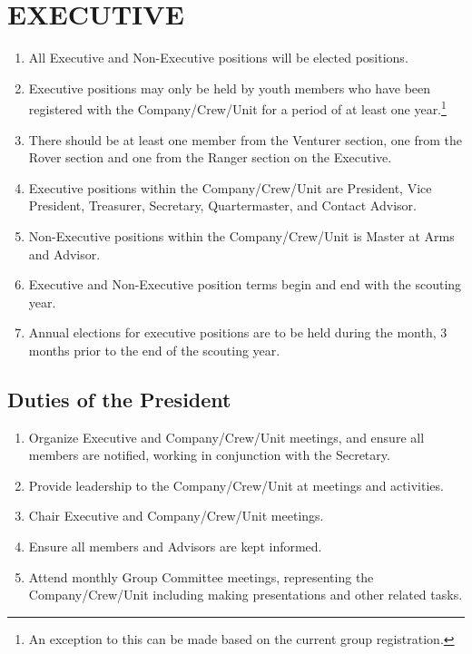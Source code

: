 \documentclass{Service_Corps_Document}
\begin{document}
    \section{EXECUTIVE}\label{sec:executive}
    \begin{enumerate}
        \item All Executive and Non-Executive positions will be elected positions.
        \item Executive positions may only be held by youth members who have been registered with the Company/Crew/Unit for a period of at least one year.\footnote{An exception to this can be made based on the current group registration.}
        \item There should be at least one member from the Venturer section, one from the Rover section and one from the Ranger section on the Executive.\footnotemark[\value{footnote}]
        \item Executive positions within the Company/Crew/Unit are President, Vice President, Treasurer, Secretary, Quartermaster, and Contact Advisor.
        \item Non-Executive positions within the Company/Crew/Unit is Master at Arms and Advisor.
        \item Executive and Non-Executive position terms begin and end with the scouting year.
        \item Annual elections for executive positions are to be held during the month, 3 months prior to the end of the scouting year.
    \end{enumerate}

    \subsection{Duties of the President}\label{subsec:duties-of-the-president}
    \begin{enumerate}
        \item Organize Executive and Company/Crew/Unit meetings, and ensure all members are notified, working in conjunction with the Secretary.
        \item Provide leadership to the Company/Crew/Unit at meetings and activities.
        \item Chair Executive and Company/Crew/Unit meetings.
        \item Ensure all members and Advisors are kept informed.
        \item Attend monthly Group Committee meetings, representing the Company/Crew/Unit including making presentations and other related tasks.
    \end{enumerate}
\end{document}
